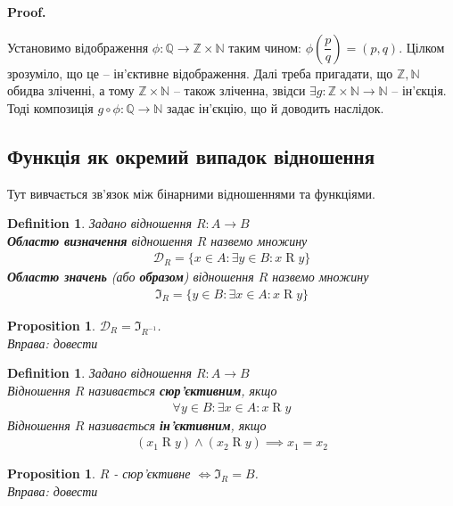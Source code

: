 \documentclass[a4paper, 14pt]{extarticle}
\makeatletter
\theoremstyle{theoremdd}
\theoremstyle{theoremdd}
\newtheorem{definition}[theorem]{Definition}
\theoremstyle{theoremdd}
\theoremstyle{theoremdd}
\theoremstyle{theoremdd}
\theoremstyle{theoremdd}
\theoremstyle{theoremdd}
\theoremstyle{theoremdd}
\theoremstyle{theoremdd}
\newtheorem{proposition}[theorem]{Proposition}
\theoremstyle{theoremdd}
\theoremstyle{theoremdd}
\theoremstyle{theoremdd}
\theoremstyle{theoremdd}
\theoremstyle{theoremdd}
\theoremstyle{theoremdd}
\renewenvironment{proof}[1][Proof.\\]{\par
\pushQED{\hfill \qed}%
\normalfont \topsep6\p@\@plus6\p@\relax
\trivlist
\item\relax
{\bfseries
#1\@addpunct{.}}\hspace\labelsep\ignorespaces
}{%
\popQED\endtrivlist\@endpefalse
}
\makeatother
\begin{document}
\begin{proof}
Установимо відображення $\phi \colon \mathbb{Q} \to \mathbb{Z} \times \mathbb{N}$ таким чином: $\phi\left( \dfrac{p}{q} \right) = (p,q)$. Цілком зрозуміло, що це -- ін'єктивне відображення. Далі треба пригадати, що $\mathbb{Z}, \mathbb{N}$ обидва зліченні, а тому $\mathbb{Z} \times \mathbb{N}$ -- також зліченна, звідси $\exists g \colon \mathbb{Z} \times \mathbb{N} \to \mathbb{N}$ -- ін'єкція. Тоді композиція $g \circ \phi \colon \mathbb{Q} \to \mathbb{N}$ задає ін'єкцію, що й доводить наслідок. 
\end{proof}

\subsection{Функція як окремий випадок відношення}
Тут вивчається зв'язок між бінарними відношеннями та функціями.
\begin{definition} 
Задано відношення $R \colon A \to B$\\
\textbf{Областю визначення} відношення $R$ назвемо множину
\begin{align*}
\mathcal{D}_R = \{x \in A: \exists y \in B: x \mathrel{R} y\}
\end{align*}
\textbf{Областю значень} (або \textbf{образом}) відношення $R$ назвемо множину
\begin{align*}
\Im_R = \{y \in B: \exists x \in A: x \mathrel{R} y\}
\end{align*}
\end{definition}

\begin{proposition}
$\mathcal{D}_R = \Im_{R^{-1}}$.\\
\textit{Вправа: довести}
\end{proposition}

\begin{definition}
Задано відношення $R \colon A \to B$\\
Відношення $R$ називається \textbf{сюр'єктивним}, якщо
\begin{align*}
\forall y \in B: \exists x \in A: x \mathrel{R} y
\end{align*}
Відношення $R$ називається \textbf{ін'єктивним}, якщо
\begin{align*}
(x_1 \mathrel{R} y) \wedge (x_2 \mathrel{R} y) \implies x_1 = x_2
\end{align*}
\end{definition}

\begin{proposition}
$R$ - сюр'єктивне $\iff \Im_R = B$.\\
\textit{Вправа: довести}
\end{proposition}
\end{document}
